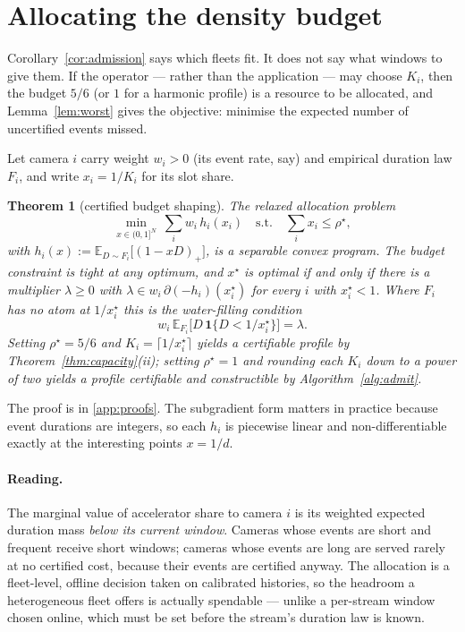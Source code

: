 \documentclass[final,5p,times,twocolumn]{elsarticle}
\newtheorem{theorem}{Theorem}
\theoremstyle{definition}
\newcommand{\Nc}{N}
\newcommand{\Ki}{K_i}
\newcommand{\dens}{\rho}
\newcommand{\Dur}{D}
\newcommand{\pos}[1]{(#1)_{+}}
\begin{document}
\section{Allocating the density budget}\label{sec:shaping}

Corollary~\ref{cor:admission} says which fleets fit. It does not say what windows to give them.
If the operator --- rather than the application --- may choose $\Ki$, then the budget $5/6$ (or
$1$ for a harmonic profile) is a resource to be allocated, and Lemma~\ref{lem:worst} gives the
objective: minimise the expected number of uncertified events missed.

Let camera $i$ carry weight $w_i>0$ (its event rate, say) and empirical duration law $F_i$, and
write $x_i=1/\Ki$ for its slot share.

\begin{theorem}[certified budget shaping]\label{thm:shaping}
The relaxed allocation problem
\[
\min_{x\in(0,1]^\Nc}\ \sum_i w_i\,h_i(x_i)
\quad\text{s.t.}\quad \sum_i x_i\le\dens^{\star},
\]
with $h_i(x):=\mathbb{E}_{\Dur\sim F_i}\!\big[\pos{1-x\Dur}\big]$,
is a separable convex program. The budget constraint is tight at any optimum, and $x^\star$ is
optimal if and only if there is a multiplier $\lambda\ge0$ with
$\lambda\in w_i\,\partial(-h_i)(x_i^\star)$ for every $i$ with $x_i^\star<1$. Where $F_i$ has no
atom at $1/x_i^\star$ this is the water-filling condition
\[
w_i\,\mathbb{E}_{F_i}\!\big[\Dur\,\mathbf 1\{\Dur<1/x_i^\star\}\big]=\lambda .
\]
Setting $\dens^{\star}=5/6$ and $\Ki=\lceil 1/x_i^\star\rceil$ yields a certifiable profile by
Theorem~\ref{thm:capacity}(ii); setting $\dens^{\star}=1$ and rounding each $\Ki$ down to a power
of two yields a profile certifiable \emph{and} constructible by Algorithm~\ref{alg:admit}.
\end{theorem}

The proof is in \ref{app:proofs}. The subgradient form matters in practice because event durations
are integers, so each $h_i$ is piecewise linear and non-differentiable exactly at the interesting
points $x=1/d$.

\paragraph{Reading.} The marginal value of accelerator share to camera $i$ is its weighted expected
duration mass \emph{below its current window}. Cameras whose events are short and frequent receive
short windows; cameras whose events are long are served rarely at no certified cost, because their
events are certified anyway. The allocation is a fleet-level, offline decision taken on
calibrated histories, so the headroom a heterogeneous fleet offers is actually spendable ---
unlike a per-stream window chosen online, which must be set before the stream's duration law is
known.
\end{document}
